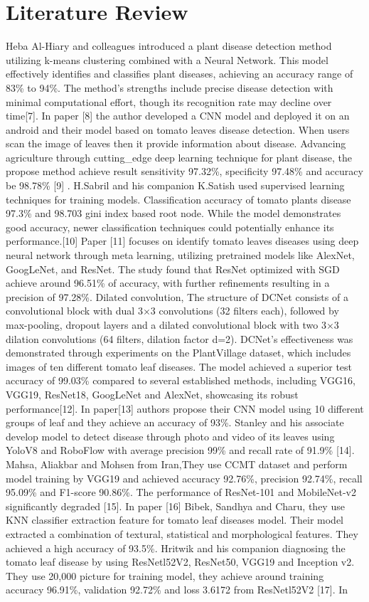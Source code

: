 \documentclass[conference]{IEEEtran}
\begin{document}
\section{Literature Review}
Heba Al-Hiary and colleagues introduced a plant disease detection method utilizing k-means clustering combined with a Neural Network. This model effectively identifies and classifies plant diseases, achieving an accuracy range of 83\% to 94\%. The method's strengths include precise disease detection with minimal computational effort, though its recognition rate may decline over time[7]. In paper [8] the author developed a CNN model and deployed it on an android and their model based on tomato leaves disease detection. When users scan the image of leaves then it provide information about disease. Advancing agriculture through cutting\_edge deep learning technique for plant disease, the propose method achieve result sensitivity 97.32\%, specificity 97.48\% and accuracy be 98.78\% [9] . H.Sabril and his companion K.Satish used supervised learning techniques for training models. Classification accuracy of tomato plants disease 97.3\% and 98.703 gini index based root node. While the model demonstrates good accuracy, newer classification techniques could potentially enhance its performance.[10] Paper [11] focuses on identify tomato leaves diseases using deep neural network through meta learning, utilizing pretrained models like AlexNet, GoogLeNet, and ResNet. The study found that ResNet optimized with SGD achieve around 96.51\% of accuracy, with further refinements resulting in a precision of 97.28\%. Dilated convolution, The structure of DCNet consists of a convolutional block with dual 3×3 convolutions (32 filters each), followed by max-pooling, dropout layers and a dilated convolutional block with two 3×3 dilation convolutions (64 filters, dilation factor d=2). DCNet's effectiveness was demonstrated through experiments on the PlantVillage dataset, which includes images of ten different tomato leaf diseases. The model achieved a superior test accuracy of 99.03\% compared to several established methods, including VGG16, VGG19, ResNet18, GoogLeNet and AlexNet, showcasing its robust performance[12]. In paper[13] authors propose their CNN model using 10 different groups of leaf and they achieve an accuracy of 93\%. Stanley and his associate develop model to detect disease through photo and video of its leaves using YoloV8 and RoboFlow with average precision 99\% and recall rate of 91.9\% [14]. Mahsa, Aliakbar and Mohsen from Iran,They use CCMT dataset and perform model training by VGG19 and achieved accuracy 92.76\%, precision 92.74\%, recall 95.09\% and F1-score 90.86\%. The performance of ResNet-101 and MobileNet-v2 significantly degraded [15]. In paper [16] Bibek, Sandhya and Charu, they use KNN classifier extraction feature for tomato leaf diseases model. Their model extracted a combination of textural, statistical and morphological features. They achieved a high accuracy of 93.5\%. Hritwik and his companion diagnosing the tomato leaf disease by using ResNetl52V2, ResNet50, VGG19 and Inception v2. They use 20,000 picture for training model, they achieve around training accuracy 96.91\%, validation 92.72\% and loss 3.6172 from ResNetl52V2 [17]. In 
\end{document}
